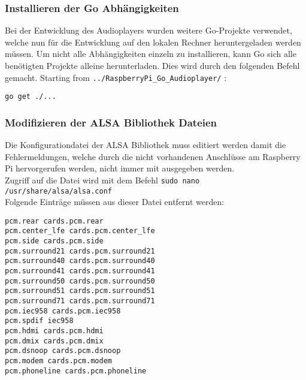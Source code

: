 \subsubsection{Installieren der Go Abhängigkeiten}
Bei der Entwicklung des Audioplayers wurden weitere Go-Projekte verwendet, welche nun für die Entwicklung auf den lokalen Rechner heruntergeladen werden müssen. Um nicht alle Abhängigkeiten einzeln zu installieren, kann Go sich alle benötigten Projekte alleine herunterladen. Dies wird durch den folgenden Befehl gemacht.
Starting from \verb|../RaspberryPi_Go_Audioplayer/| :
\begin{lstlisting}
go get ./...  
\end{lstlisting}

\subsubsection{Modifizieren der ALSA Bibliothek Dateien}
Die Konfigurationdatei der ALSA Bibliothek muss editiert werden damit die Fehlermeldungen, welche durch die nicht vorhandenen Anschlüsse am Raspberry Pi hervorgerufen werden, nicht immer mit ausgegeben werden. \\
Zugriff auf die Datei wird mit dem Befehl \verb|sudo nano /usr/share/alsa/alsa.conf|  \\
Folgende Einträge müssen aus dieser Datei entfernt werden:
\begin{lstlisting}[caption={Liste der zu löschenden Einträge}]
pcm.rear cards.pcm.rear 
pcm.center_lfe cards.pcm.center_lfe 
pcm.side cards.pcm.side 
pcm.surround21 cards.pcm.surround21 
pcm.surround40 cards.pcm.surround40 
pcm.surround41 cards.pcm.surround41 
pcm.surround50 cards.pcm.surround50 
pcm.surround51 cards.pcm.surround51 
pcm.surround71 cards.pcm.surround71 
pcm.iec958 cards.pcm.iec958 
pcm.spdif iec958 
pcm.hdmi cards.pcm.hdmi 
pcm.dmix cards.pcm.dmix 
pcm.dsnoop cards.pcm.dsnoop 
pcm.modem cards.pcm.modem 
pcm.phoneline cards.pcm.phoneline
\end{lstlisting}

